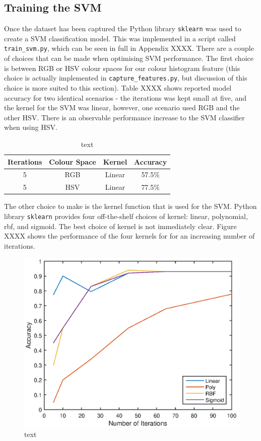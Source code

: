 \documentclass[a4paper]{article}
\begin{document}
\subsection{Training the SVM}
Once the dataset has been captured the Python library \verb|sklearn| was used to create a SVM classification model. This was implemented in a script called \verb|train_svm.py|, which can be seen in full in Appendix XXXX. There are a couple of choices that can be made when optimising SVM performance. The first choice is between RGB or HSV colour spaces for our colour histogram feature (this choice is actually implemented in \verb|capture_features.py|, but discussion of this choice is more suited to this section). Table XXXX shows reported model accuracy for two identical scenarios - the iterations was kept small at five, and the kernel for the SVM was linear, however,  one scenario used RGB and the other HSV. There is an observable performance increase to the SVM classifier when using HSV.
\begin{table}[h]
	\centering
	\caption{text}
	\begin{tabular}{cccc}
		\toprule
		\textbf{Iterations} & \textbf{Colour Space} & \textbf{Kernel} & \textbf{Accuracy}\\
		\midrule
		5 & RGB & Linear & 57.5\%\\
		5 & HSV & Linear & 77.5\%\\
		\bottomrule
	\end{tabular}
\end{table}

The other choice to make is the kernel function that is used for the SVM. Python library \verb|sklearn| provides four off-the-shelf choices of kernel: linear, polynomial, rbf, and sigmoid. The best choice of kernel is not immediately clear. Figure XXXX shows the performance of the four kernels for for an increasing number of iterations.  
\begin{figure}[h]
	\centering
	\includegraphics[scale=0.6]{kernels}
	\caption{text}
\end{figure}
\end{document}
